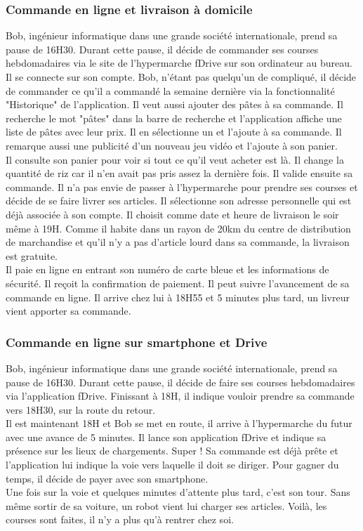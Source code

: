 				\subsubsection{Commande en ligne et livraison à domicile}
					Bob, ingénieur informatique dans une grande société internationale, prend sa pause de 16H30. Durant cette pause, il décide de commander ses courses hebdomadaires via le site de l'\gls{hypermarche} fDrive sur son ordinateur au bureau.\\
					Il se connecte sur son compte. Bob, n'étant pas quelqu'un de compliqué, il décide de commander ce qu'il a commandé la semaine dernière via la fonctionnalité "Historique" de l'application. Il veut aussi ajouter des pâtes à sa commande. Il recherche le mot "pâtes" dans la barre de recherche et l'application affiche une liste de pâtes avec leur prix. Il en sélectionne un et l'ajoute à sa commande. Il remarque aussi une publicité d'un nouveau jeu vidéo et l'ajoute à son panier.\\
Il consulte son panier pour voir si tout ce qu'il veut acheter est là. Il change la quantité de riz car il n'en avait pas pris assez la dernière fois. Il valide ensuite sa commande. Il n'a pas envie de passer à l'\gls{hypermarche} pour prendre ses courses et décide de se faire livrer ses articles. Il sélectionne son adresse personnelle qui est déjà associée à son compte. Il choisit comme date et heure de livraison le soir même à 19H. Comme il habite dans un rayon de 20km du centre de distribution de marchandise et qu'il n'y a pas d'article lourd dans sa commande, la livraison est gratuite. \\
Il paie en ligne en entrant son numéro de carte bleue et les informations de sécurité. Il reçoit la confirmation de paiement. Il peut suivre l'avancement de sa commande en ligne.
Il arrive chez lui à 18H55 et 5 minutes plus tard, un livreur vient apporter sa commande.
				\subsubsection{Commande en ligne sur \gls{smartphone} et Drive}
					Bob, ingénieur informatique dans une grande société internationale, prend sa pause de 16H30. Durant cette pause, il décide de faire ses courses hebdomadaires via l'application fDrive. Finissant à 18H, il indique vouloir prendre sa commande vers 18H30, sur la route du retour.\\
Il est maintenant 18H et Bob se met en route, il arrive à l'\gls{hypermarche} du futur avec une avance de 5 minutes. Il lance son application fDrive et indique sa présence sur les lieux de chargements. Super ! Sa commande est déjà prête et l'application lui indique la voie vers laquelle il doit se diriger. Pour gagner du temps, il décide de payer avec son \gls{smartphone}.\\
Une fois sur la voie et quelques minutes d'attente plus tard, c'est son tour. Sans même sortir de sa voiture, un \gls{robot} vient lui charger ses articles. Voilà, les courses sont faites, il n'y a plus qu'à rentrer chez soi.
